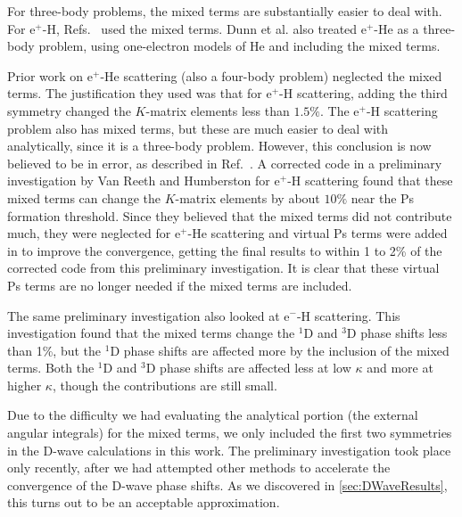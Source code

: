 \documentclass[Dissertation.tex]{subfiles}
\begin{document}
For three-body problems, the mixed terms are substantially easier to deal
with. For e$^+$-H, Refs.~\cite{Brown1985a,BrownThesis,WattsThesis,Humberston1997,VanReeth1997}
used the mixed terms. Dunn et al. \cite{Dunn2000,DunnThesis} also treated
e$^+$-He as a three-body problem, using one-electron models of He and
including the mixed terms.

Prior work \cite{VanReeth1997,VanReethThesis} on e$^+$-He scattering (also a
four-body problem) neglected the mixed terms. The justification they used was
that for e$^+$-H scattering, adding the third symmetry changed the $K$-matrix
elements less than $1.5\%$. The e$^+$-H scattering problem also has mixed
terms, but these are much easier to deal with analytically, since it is a
three-body problem. However, this conclusion is now believed to be in error, as
described in Ref.~\cite{Woods2015}. A corrected code in a preliminary
investigation by Van Reeth and Humberston \cite{VanReeth2015} for e$^+$-H
scattering found that these mixed terms can change the $K$-matrix elements by
about $10\%$ near the Ps formation threshold. Since they believed that the
mixed terms did not contribute much, they were neglected for e$^+$-He scattering
and virtual Ps terms were added in to improve the convergence, getting the final
results to within 1 to 2\% of the corrected code from this preliminary
investigation. It is clear that these virtual Ps terms are no longer needed if
the mixed terms are included.

The same preliminary investigation \cite{VanReeth2015} also looked at e$^-$-H
scattering. This investigation found that the mixed terms change the $^1$D and
$^3$D phase shifts less than 1\%, but the $^1$D phase shifts are affected more
by the inclusion of the mixed terms. Both the $^1$D and $^3$D phase shifts are
affected less at low $\kappa$ and more at higher $\kappa$, though the
contributions are still small.

Due to the difficulty we had evaluating the analytical portion (the external
angular integrals) for the mixed terms, we only included the first two
symmetries in the D-wave calculations in this work. The preliminary investigation
\cite{VanReeth2015} took place only recently, after we had attempted other
methods %
to accelerate the convergence
of the D-wave phase shifts. As we discovered in \cref{sec:DWaveResults}, this
turns out to be an acceptable approximation.
\end{document}
